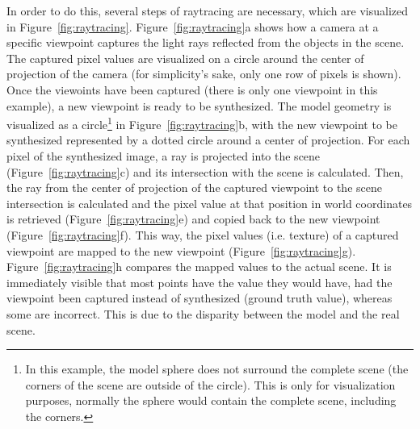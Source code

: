 In order to do this, several steps of raytracing are necessary, which are visualized in Figure~\ref{fig:raytracing}. Figure~\ref{fig:raytracing}a shows how a camera at a specific viewpoint captures the light rays reflected from the objects in the scene. The captured pixel values are visualized on a circle around the center of projection of the camera (for simplicity's sake, only one row of pixels is shown). Once the viewoints have been captured (there is only one viewpoint in this example), a new viewpoint is ready to be synthesized. The model geometry is visualized as a circle\footnote{In this example, the model sphere does not surround the complete scene (the corners of the scene are outside of the circle). This is only for visualization purposes, normally the sphere would contain the complete scene, including the corners.} in Figure~\ref{fig:raytracing}b, with the new viewpoint to be synthesized represented by a dotted circle around a center of projection. For each pixel of the synthesized image, a ray is projected into the scene (Figure~\ref{fig:raytracing}c) and its intersection with the scene is calculated. Then, the ray from the center of projection of the captured viewpoint to the scene intersection is calculated and the pixel value at that position in world coordinates is retrieved (Figure~\ref{fig:raytracing}e) and copied back to the new viewpoint (Figure~\ref{fig:raytracing}f). This way, the pixel values (i.e. texture) of a captured viewpoint are mapped to the new viewpoint (Figure~\ref{fig:raytracing}g). Figure~\ref{fig:raytracing}h compares the mapped values to the actual scene. It is immediately visible that most points have the value they would have, had the viewpoint been captured instead of synthesized (ground truth value), whereas some are incorrect. This is due to the disparity between the model and the real scene.

